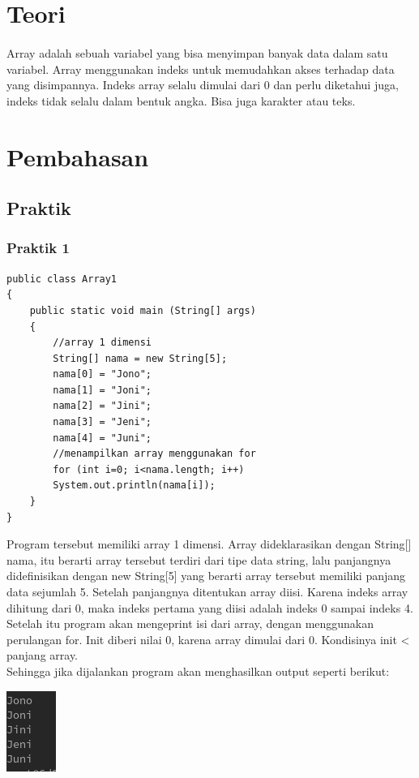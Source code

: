 \documentclass[a4paper,12pt]{article}
\begin{document}
\section{Teori}
\paragraph{}
Array adalah sebuah variabel yang bisa menyimpan banyak data dalam
satu variabel.
Array menggunakan indeks untuk memudahkan akses terhadap data
yang disimpannya.
Indeks array selalu dimulai dari 0 dan perlu diketahui juga, indeks tidak
selalu dalam bentuk angka. Bisa juga karakter atau teks.

\newpage

\section{Pembahasan}
\subsection{Praktik}
\subsubsection{Praktik 1}
\begin{lstlisting}
public class Array1
{
    public static void main (String[] args)
    {
        //array 1 dimensi
        String[] nama = new String[5];
        nama[0] = "Jono";
        nama[1] = "Joni";
        nama[2] = "Jini";
        nama[3] = "Jeni";
        nama[4] = "Juni";
        //menampilkan array menggunakan for
        for (int i=0; i<nama.length; i++)
        System.out.println(nama[i]);
    }
}
\end{lstlisting}
Program tersebut memiliki array 1 dimensi. Array dideklarasikan dengan String[] nama, itu berarti array tersebut terdiri dari tipe data string, lalu panjangnya didefinisikan dengan new String[5]
yang berarti array tersebut memiliki panjang data sejumlah 5. Setelah panjangnya ditentukan array diisi. Karena indeks array dihitung dari 0, maka indeks pertama yang diisi adalah indeks 0 
sampai indeks 4. Setelah itu program akan mengeprint isi dari array, dengan menggunakan perulangan for. Init diberi nilai 0, karena array dimulai dari 0. Kondisinya init < panjang array.\\
Sehingga jika dijalankan program akan menghasilkan output seperti berikut:\\
\begin{center}
    \includegraphics[scale=.7]{1.png}
\end{center}
\end{document}
